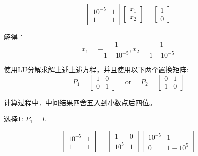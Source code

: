 \begin{example}
    \begin{equation} \left[\begin{array}{cc}10^{-5} & 1 \\ 1 & 1\end{array}\right]\left[\begin{array}{l}x_{1} \\ x_{2}\end{array}\right]=\left[\begin{array}{l}1 \\ 0\end{array}\right] \end{equation}

    解得： \begin{equation} x_{1}=-\frac{1}{1-10^{-5}}, x_{2}=\frac{1}{1-10^{-5}} \end{equation}

    使用LU分解求解上述上述方程，并且使用以下两个置换矩阵:
    \begin{equation}
        P_{1}=\left[\begin{array}{ll}
                1 & 0 \\
                0 & 1
            \end{array}\right] \quad \text { or } \quad P_{2}=\left[\begin{array}{ll}
                0 & 1 \\
                1 & 0
            \end{array}\right]
    \end{equation}

    计算过程中，中间结果四舍五入到小数点后四位。

    选择1: $  P_{1}=I $.

    \begin{equation}
        \left[\begin{array}{cc}
                10^{-5} & 1 \\
                1       & 1
            \end{array}\right]=\left[\begin{array}{cc}
                1      & 0 \\
                10^{5} & 1
            \end{array}\right]\left[\begin{array}{cc}
                10^{-5} & 1        \\
                0       & 1-10^{5}
            \end{array}\right]
    \end{equation}


\end{example}
